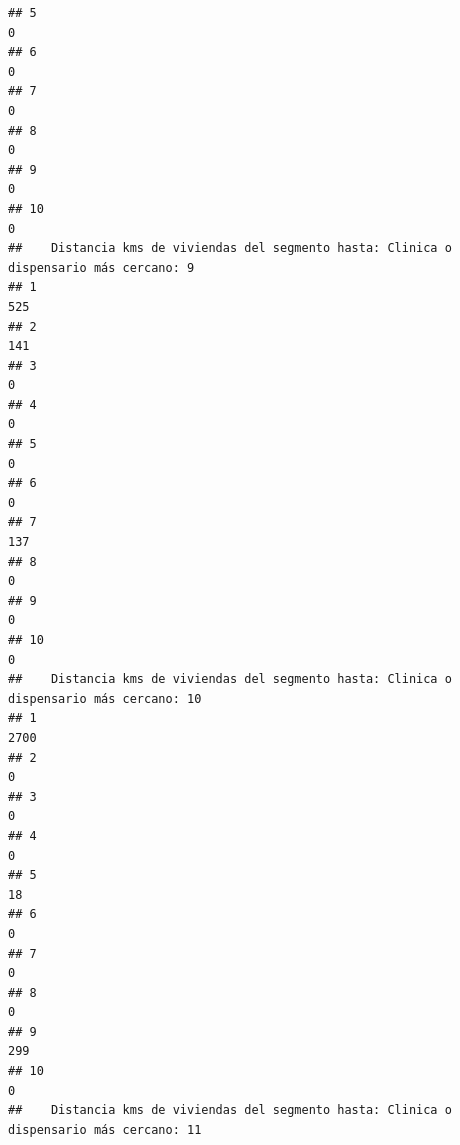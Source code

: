\documentclass[11pt,]{article}
\begin{document}
\begin{verbatim}
## 5                                                                                    0
## 6                                                                                    0
## 7                                                                                    0
## 8                                                                                    0
## 9                                                                                    0
## 10                                                                                   0
##    Distancia kms de viviendas del segmento hasta: Clinica o dispensario más cercano: 9
## 1                                                                                  525
## 2                                                                                  141
## 3                                                                                    0
## 4                                                                                    0
## 5                                                                                    0
## 6                                                                                    0
## 7                                                                                  137
## 8                                                                                    0
## 9                                                                                    0
## 10                                                                                   0
##    Distancia kms de viviendas del segmento hasta: Clinica o dispensario más cercano: 10
## 1                                                                                  2700
## 2                                                                                     0
## 3                                                                                     0
## 4                                                                                     0
## 5                                                                                    18
## 6                                                                                     0
## 7                                                                                     0
## 8                                                                                     0
## 9                                                                                   299
## 10                                                                                    0
##    Distancia kms de viviendas del segmento hasta: Clinica o dispensario más cercano: 11

\end{verbatim}
\end{document}
